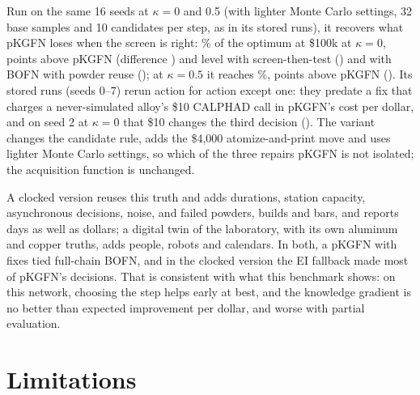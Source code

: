 \documentclass[11pt]{article}
\begin{document}
\begin{itemize}[leftmargin=*]
Run on the same 16 seeds at $\kappa=0$ and 0.5 (with lighter Monte Carlo
settings, 32 base samples and 10 candidates per step, as in its stored runs), it
recovers what pKGFN loses when the screen is right: \%
of the optimum at \$100k at $\kappa=0$, 
points above pKGFN (difference ) and level with
screen-then-test () and with BOFN with powder
reuse (); at $\kappa=0.5$ it reaches
\%,  points
above pKGFN (). Its stored runs (seeds 0--7)
rerun action for action except one: they predate a fix that charges a
never-simulated alloy's \$10 CALPHAD call in pKGFN's cost per dollar, and on seed
2 at $\kappa=0$ that \$10 changes the third decision
(). The variant changes the candidate
rule, adds the \$4,000 atomize-and-print move and uses lighter Monte Carlo
settings, so which of the three repairs pKGFN is not isolated; the acquisition
function is unchanged.
\end{itemize}

A clocked version reuses this truth and adds durations, station capacity,
asynchronous decisions, noise, and failed powders, builds and bars, and reports
days as well as dollars; a digital twin of the laboratory, with its own aluminum
and copper truths, adds people, robots and calendars.  In both, a pKGFN with fixes
tied full-chain BOFN, and in the clocked version the EI fallback made most of
pKGFN's decisions. That is consistent with what this benchmark shows: on this
network, choosing the step helps early at best, and the knowledge gradient is no
better than expected improvement per dollar, and worse with partial evaluation.

\section*{Limitations}
\end{document}
